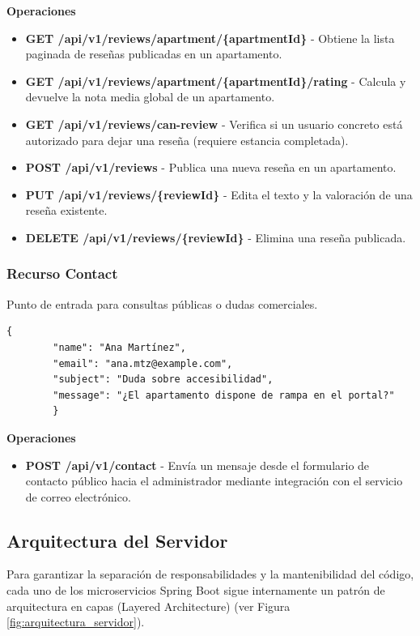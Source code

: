         \textbf{Operaciones}
        \begin{itemize}
            \item \textbf{GET /api/v1/reviews/apartment/\{apartmentId\}} - Obtiene la lista paginada de reseñas publicadas en un apartamento.
            \item \textbf{GET /api/v1/reviews/apartment/\{apartmentId\}/rating} - Calcula y devuelve la nota media global de un apartamento.
            \item \textbf{GET /api/v1/reviews/can-review} - Verifica si un usuario concreto está autorizado para dejar una reseña (requiere estancia completada).
            \item \textbf{POST /api/v1/reviews} - Publica una nueva reseña en un apartamento.
            \item \textbf{PUT /api/v1/reviews/\{reviewId\}} - Edita el texto y la valoración de una reseña existente.
            \item \textbf{DELETE /api/v1/reviews/\{reviewId\}} - Elimina una reseña publicada.
        \end{itemize}

    \subsubsection{Recurso Contact}
        Punto de entrada para consultas públicas o dudas comerciales.
        \begin{lstlisting}[basicstyle=\jsonbasicfont,frame=single,backgroundcolor=\color{white},rulecolor=\color{black},framerule=0.5pt,numbers=none]
        {
        "name": "Ana Martínez",
        "email": "ana.mtz@example.com",
        "subject": "Duda sobre accesibilidad",
        "message": "¿El apartamento dispone de rampa en el portal?"
        }
        \end{lstlisting}

        \textbf{Operaciones}
        \begin{itemize}
            \item \textbf{POST /api/v1/contact} - Envía un mensaje desde el formulario de contacto público hacia el administrador mediante integración con el servicio de correo electrónico.
        \end{itemize}

    \subsection{Arquitectura del Servidor}
        Para garantizar la separación de responsabilidades y la mantenibilidad del código, cada uno de los microservicios Spring Boot sigue internamente un patrón de arquitectura en capas (Layered Architecture) \cite[pp.~20--24]{buschmann1996} (ver Figura \ref{fig:arquitectura_servidor}).

